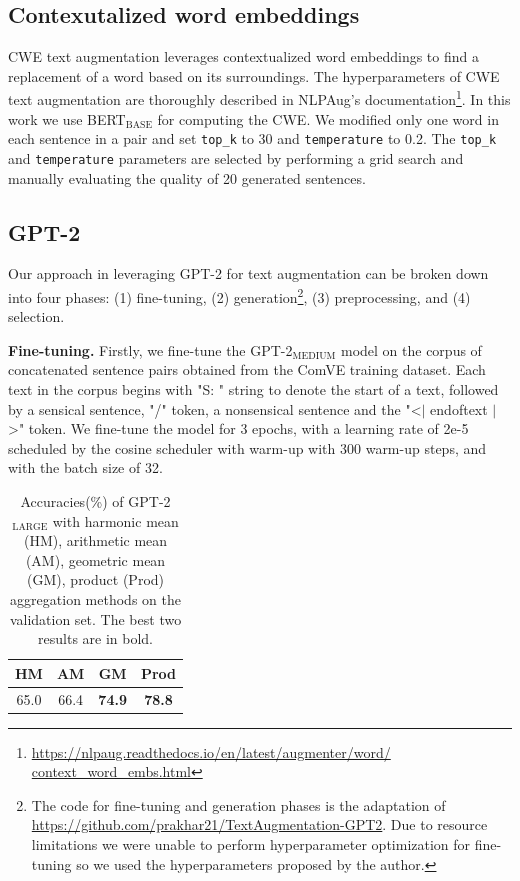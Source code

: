 \documentclass[10pt, a4paper]{article}
\begin{document}
\subsection{Contexutalized word embeddings}
\label{cwe}
CWE text augmentation leverages contextualized word embeddings to find a replacement of a word based on its surroundings. The hyperparameters of CWE text augmentation are thoroughly described in NLPAug's documentation\footnote{\href{https://nlpaug.readthedocs.io/en/latest/augmenter/\\word/context\_word\_embs.html}{https://nlpaug.readthedocs.io/en/latest/augmenter/word/\\context\_word\_embs.html}}. In this work we use BERT$_{\text{BASE}}$ for computing the CWE. We modified only one word in each sentence in a pair and set \texttt{top\_k} to 30 and \texttt{temperature} to 0.2. The \texttt{top\_k} and \texttt{temperature} parameters are selected by performing a grid search and manually evaluating the quality of 20 generated sentences.

\subsection{GPT-2}
Our approach in leveraging GPT-2 for text augmentation can be broken down into four phases: (1) fine-tuning, (2) generation\footnote{The code for fine-tuning and generation phases is the adaptation of \href{https://github.com/prakhar21/TextAugmentation-GPT2}{https://github.com/prakhar21/TextAugmentation-GPT2}. Due to resource limitations we were unable to perform hyperparameter optimization for fine-tuning so we used the hyperparameters proposed by the author.}, (3) preprocessing, and (4) selection.

\textbf{Fine-tuning.} Firstly, we fine-tune the GPT-2$_\text{MEDIUM}$ model on the corpus of concatenated sentence pairs obtained from the ComVE training dataset. Each text in the corpus begins with "S: " string to denote the start of a text, followed by a sensical sentence, "/" token, a nonsensical sentence and the "\textless$\vert$ endoftext $\vert$\textgreater" token. We fine-tune the model for 3 epochs, with a learning rate of 2e-5 scheduled by the cosine scheduler with warm-up with 300 warm-up steps, and with the batch size of 32.

\begin{table}[t]
    \caption{Accuracies(\%) of GPT-2$_\text{LARGE}$ with harmonic mean (HM), arithmetic mean (AM), geometric mean (GM), product (Prod) aggregation methods on the validation set. The best two results are in bold.}
    \begin{center}
        

    \begin{tabular}{cccc}
    \toprule
         HM & AM & GM & Prod\\
         \midrule
           65.0 & 66.4 & \textbf{74.9} & \textbf{78.8}\\
          \bottomrule
    \end{tabular}

    \label{tab:LM}

    \end{center}
\end{table}
\end{document}
